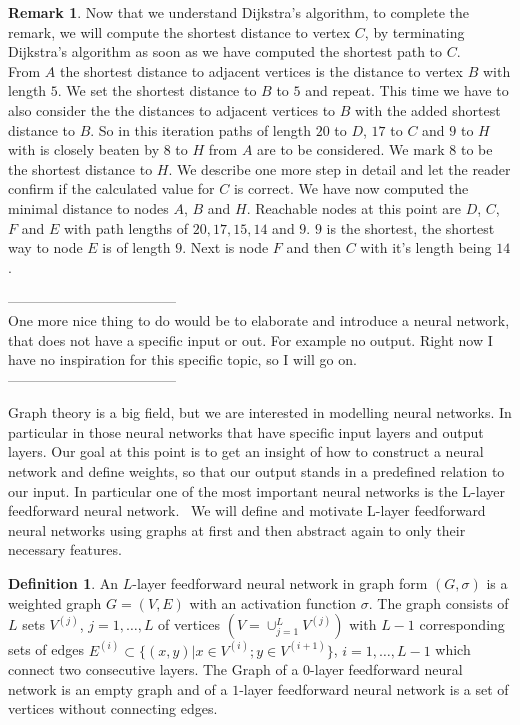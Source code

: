\documentclass{article}
\theoremstyle{definition}
\newtheorem{definition}[theorem]{Definition}
\newtheorem{remark}[theorem]{Remark}
\begin{document}
\begin{remark}
Now that we understand Dijkstra's algorithm, to complete the remark, we will compute the shortest distance to vertex $C$, by terminating Dijkstra's algorithm as soon as we have computed the shortest path to $C$. \\
From $A$ the shortest distance to adjacent vertices is the distance to vertex $B$ with length $5$. We set the shortest distance to $B$ to $5$ and repeat. This time we have to also consider the the distances to adjacent vertices to $B$ with the added shortest distance to $B$. So in this iteration paths of length $20$ to $D$, $17$ to $C$ and $9$ to $H$ with is closely beaten by $8$ to $H$ from $A$ are to be considered. We mark $8$ to be the shortest distance to $H$. We describe one more step in detail and let the reader confirm if the calculated value for $C$ is correct. We have now computed the minimal distance to nodes $A$, $B$ and $H$. Reachable nodes at this point are $D$, $C$, $F$ and $E$ with path lengths of $20, 17, 15, 14$ and $9$. $9$ is the shortest, the shortest way to node $E$ is of length $9$. Next is node $F$ and then $C$ with it's length being $14$.

\end{remark}

------------------------------------ \\
One more nice thing to do would be to elaborate and introduce a neural network, that does not have a specific input or out. For example no output. Right now I have no inspiration for this specific topic, so I will go on. \\
------------------------------------

Graph theory is a big field, but we are interested in modelling neural networks. In particular in those neural networks that have specific input layers and output layers. Our goal at this point is to get an insight of how to construct a neural network and define weights, so that our output stands in a predefined relation to our input.
In particular one of the most important neural networks is the L-layer feedforward neural network. \
We will define and motivate L-layer feedforward neural networks using graphs at first and then abstract again to only their necessary features.

\begin{definition}
An $L$-layer feedforward neural network in graph form $(G, \sigma)$ is a weighted graph $G=(V, E)$ with an activation function $\sigma$. The graph consists of $L$ sets $V^{(j)}$, $j = 1, \dots , L$ of vertices $(V=\cup_{j=1}^{L}V^{(j)})$ with $L-1$ corresponding sets of edges $E^{(i)} \subset \{(x,y)|x \in V^{(i)}; y \in V^{(i+1)}\}$, $i = 1, \dots , L-1$ which connect two consecutive layers.  The Graph of a $0$-layer feedforward neural network is an empty graph and of a $1$-layer feedforward neural network is a set of vertices without connecting edges.
\end{definition}
\end{document}
